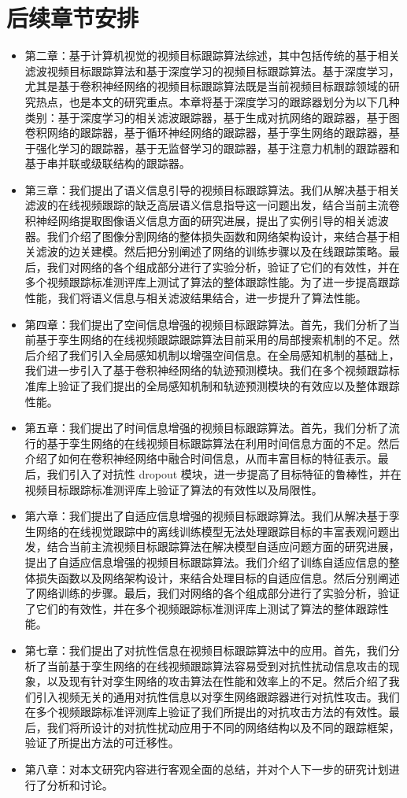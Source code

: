 \section{后续章节安排}
\begin{itemize}
\item 第二章：基于计算机视觉的视频目标跟踪算法综述，其中包括传统的基于相关滤波视频目标跟踪算法和基于深度学习的视频目标跟踪算法。基于深度学习，尤其是基于卷积神经网络的视频目标跟踪算法既是当前视频目标跟踪领域的研究热点，也是本文的研究重点。本章将基于深度学习的跟踪器划分为以下几种类别：基于深度学习的相关滤波跟踪器，基于生成对抗网络的跟踪器，基于图卷积网络的跟踪器，基于循环神经网络的跟踪器，基于孪生网络的跟踪器，基于强化学习的跟踪器，基于无监督学习的跟踪器，基于注意力机制的跟踪器和基于串并联或级联结构的跟踪器。
\item 第三章：我们提出了语义信息引导的视频目标跟踪算法。我们从解决基于相关滤波的在线视频跟踪的缺乏高层语义信息指导这一问题出发，结合当前主流卷积神经网络提取图像语义信息方面的研究进展，提出了实例引导的相关滤波器。我们介绍了图像分割网络的整体损失函数和网络架构设计，来结合基于相关滤波的边关建模。然后把分别阐述了网络的训练步骤以及在线跟踪策略。最后，我们对网络的各个组成部分进行了实验分析，验证了它们的有效性，并在多个视频跟踪标准测评库上测试了算法的整体跟踪性能。为了进一步提高跟踪性能，我们将语义信息与相关滤波结果结合，进一步提升了算法性能。
\item 第四章：我们提出了空间信息增强的视频目标跟踪算法。首先，我们分析了当前基于孪生网络的在线视频跟踪跟踪算法目前采用的局部搜索机制的不足。然后介绍了我们引入全局感知机制以增强空间信息。在全局感知机制的基础上，我们进一步引入了基于卷积神经网络的轨迹预测模块。我们在多个视频跟踪标准库上验证了我们提出的全局感知机制和轨迹预测模块的有效应以及整体跟踪性能。
\item 第五章：我们提出了时间信息增强的视频目标跟踪算法。首先，我们分析了流行的基于孪生网络的在线视频目标跟踪算法在利用时间信息方面的不足。然后介绍了如何在卷积神经网络中融合时间信息，从而丰富目标的特征表示。最后，我们引入了对抗性 dropout 模块，进一步提高了目标特征的鲁棒性，并在视频目标跟踪标准测评库上验证了算法的有效性以及局限性。
\item 第六章：我们提出了自适应信息增强的视频目标跟踪算法。我们从解决基于孪生网络的在线视觉跟踪中的离线训练模型无法处理跟踪目标的丰富表观问题出发，结合当前主流视频目标跟踪算法在解决模型自适应问题方面的研究进展，提出了自适应信息增强的视频目标跟踪算法。我们介绍了训练自适应信息的整体损失函数以及网络架构设计，来结合处理目标的自适应信息。然后分别阐述了网络训练的步骤。最后，我们对网络的各个组成部分进行了实验分析，验证了它们的有效性，并在多个视频跟踪标准测评库上测试了算法的整体跟踪性能。
\item 第七章：我们提出了对抗性信息在视频目标跟踪算法中的应用。首先，我们分析了当前基于孪生网络的在线视频跟踪算法容易受到对抗性扰动信息攻击的现象，以及现有针对孪生网络的攻击算法在性能和效率上的不足。然后介绍了我们引入视频无关的通用对抗性信息以对孪生网络跟踪器进行对抗性攻击。我们在多个视频跟踪标准评测库上验证了我们所提出的对抗攻击方法的有效性。最后，我们将所设计的对抗性扰动应用于不同的网络结构以及不同的跟踪框架，验证了所提出方法的可迁移性。
\item 第八章：对本文研究内容进行客观全面的总结，并对个人下一步的研究计划进行了分析和讨论。
\end{itemize}